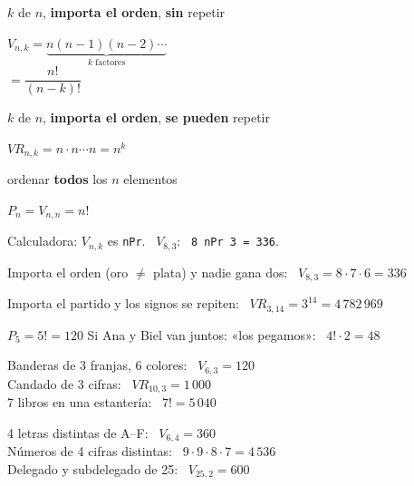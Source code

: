 \documentclass[11pt,a4paper]{article}
\newcommand{\comic}{\fontfamily{ComicNeue-TLF}\selectfont}
\begin{document}
\vfill
\begin{tcbraster}[raster columns=3,raster equal height,raster column skip=8pt]
\begin{tcolorbox}[fmbase,colback=fmA!8,colframe=fmA,coltitle=white,title={Variaciones},before upper=\centering]
\small $k$ de $n$, \textbf{importa el orden}, \textbf{sin} repetir\par\smallskip
\normalsize$V_{n,k}=\underbrace{n(n-1)(n-2)\cdots}_{k\text{ factores}}$\\[2pt] $=\dfrac{n!}{(n-k)!}$
\end{tcolorbox}
\begin{tcolorbox}[fmbase,colback=fmB!8,colframe=fmB,coltitle=white,title={Con repetición},before upper=\centering]
\small $k$ de $n$, \textbf{importa el orden}, \textbf{se pueden} repetir\par\smallskip
\normalsize$VR_{n,k}=n\cdot n\cdots n=n^k$
\end{tcolorbox}
\begin{tcolorbox}[fmbase,colback=fmK!8,colframe=fmK,coltitle=white,title={Permutaciones},before upper=\centering]
\small ordenar \textbf{todos} los $n$ elementos\par\smallskip
\normalsize$P_n=V_{n,n}=n!$
\end{tcolorbox}
\end{tcbraster}
{\comic\color{fmmuted}\centering Calculadora: $V_{n,k}$ es \texttt{nPr}. \ $V_{8,3}$: \ \texttt{8 nPr 3 = 336}.\par}

\vfill
\begin{exemple}
Importa el orden (oro $\neq$ plata) y nadie gana dos: \ $V_{8,3}=8\cdot7\cdot6=\boxed{336}$
\end{exemple}

\vfill
\begin{exemple}
Importa el partido y los signos se repiten: \ $VR_{3,14}=3^{14}=\boxed{4\,782\,969}$
\end{exemple}

\vfill
\begin{exemple}
$P_5=5!=\boxed{120}$ \qquad Si Ana y Biel van juntos: «los pegamos»: \ $4!\cdot2=\boxed{48}$
\end{exemple}

\vfill
\begin{exemple}[Ejemplos]
\begin{minipage}[t]{0.49\linewidth}
Banderas de 3 franjas, 6 colores: \ $V_{6,3}=120$\\[3pt]
Candado de 3 cifras: \ $VR_{10,3}=1\,000$\\[3pt]
7 libros en una estantería: \ $7!=5\,040$
\end{minipage}\hfill
\begin{minipage}[t]{0.49\linewidth}
4 letras distintas de A--F: \ $V_{6,4}=360$\\[3pt]
Números de 4 cifras distintas: \ $9\cdot9\cdot8\cdot7=4\,536$\\[3pt]
Delegado y subdelegado de 25: \ $V_{25,2}=600$
\end{minipage}
\end{exemple}
\end{document}
